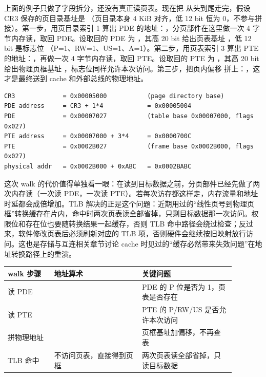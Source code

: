 上面的例子只做了字段拆分，还没有真正读页表。现在把  从头到尾走完，假设 CR3 保存的页目录基址是 （页目录本身 4 KiB 对齐，低 12 bit 恒为 0，不参与拼接）。第一步，用页目录索引 1 算出 PDE 的地址：，分页部件在这里做一次 4 字节内存读，取回 PDE。设取回的 PDE 为 ，其高 20 bit 给出页表基址 ，低 12 bit 是标志位 （P=1、RW=1、US=1、A=1）。第二步，用页表索引 3 算出 PTE 的地址：，再做一次 4 字节内存读，取回 PTE。设取回的 PTE 为 ，其高 20 bit 给出物理页框基址 ，标志位同样允许本次访问。第三步，把页内偏移  拼上：，这才是最终送到 cache 和外部总线的物理地址。

\begin{lstlisting}
CR3             = 0x00005000           (page directory base)
PDE address     = CR3 + 1*4            = 0x00005004
PDE             = 0x00007027           (table base 0x00007000, flags 0x027)
PTE address     = 0x00007000 + 3*4     = 0x0000700C
PTE             = 0x0002B027           (frame base 0x0002B000, flags 0x027)
physical addr   = 0x0002B000 + 0xABC   = 0x0002BABC
\end{lstlisting}

这次 walk 的代价值得单独看一眼：在读到目标数据之前，分页部件已经先做了两次内存读（一次读 PDE，一次读 PTE）。若每次访存都这样走，内存流量和地址时延都会成倍增加。TLB 解决的正是这个问题：近期用过的“线性页号到物理页框”转换缓存在片内，命中时两次页表读全部省掉，只剩目标数据那一次访问。权限位和存在位也要随转换结果一起缓存，否则 TLB 命中路径会绕过检查；反过来，软件修改页表后必须刷新对应的 TLB 项，否则硬件会继续按旧映射放行访问。这也是存储与互连相关章节讨论 cache 时见过的“缓存必然带来失效问题”在地址转换路径上的重演。

\begin{longtable}{L{0.18\linewidth}L{0.34\linewidth}L{0.36\linewidth}}
\toprule
walk 步骤 & 地址算术 & 关键问题 \\
\midrule
读 PDE &  & PDE 的 P 位是否为 1，页表是否存在 \\\tablerowrule
读 PTE &  & PTE 的 P/RW/US 是否允许本次访问 \\\tablerowrule
拼物理地址 &  & 页框基址加偏移，不再查表 \\\tablerowrule
TLB 命中 & 不访问页表，直接得到页框 & 两次页表读全部省掉，只读目标数据 \\
\bottomrule
\end{longtable}


